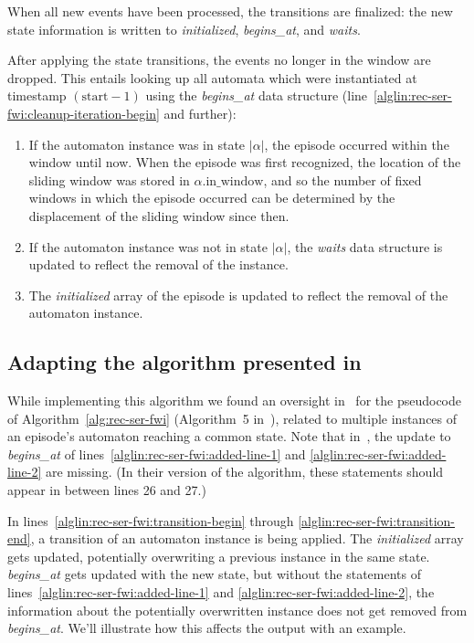 When all new events have been processed, the transitions are finalized: the new state information is written to \emph{initialized}, \emph{begins\_at}, and \emph{waits}.

After applying the state transitions, the events no longer in the window are dropped. This entails looking up all automata which were instantiated at timestamp $ (\text{start} - 1) $ using the \emph{begins\_at} data structure (line~\ref{alglin:rec-ser-fwi:cleanup-iteration-begin} and further):

\begin{enumerate}
\item If the automaton instance was in state $ | \alpha | $, the episode occurred within the window until now. When the episode was first recognized, the location of the sliding window was stored in $ \alpha \text{.in\_window} $, and so the number of fixed windows in which the episode occurred can be determined by the displacement of the sliding window since then.
\item If the automaton instance was not in state $ | \alpha | $, the \emph{waits} data structure is updated to reflect the removal of the instance.
\item The \emph{initialized} array of the episode is updated to reflect the removal of the automaton instance.
\end{enumerate}

\subsection{Adapting the algorithm presented in~\citep{mannila1997discovery}}

While implementing this algorithm we found an oversight in~\citep{mannila1997discovery} for the pseudocode of Algorithm~\ref{alg:rec-ser-fwi} (Algorithm~5 in~\citep{mannila1997discovery}), related to multiple instances of an episode's automaton reaching a common state. Note that in~\citep{mannila1997discovery}, the update to \emph{begins\_at} of lines~\ref{alglin:rec-ser-fwi:added-line-1} and \ref{alglin:rec-ser-fwi:added-line-2} are missing. (In their version of the algorithm, these statements should appear in between lines 26 and 27.)

In lines~\ref{alglin:rec-ser-fwi:transition-begin} through \ref{alglin:rec-ser-fwi:transition-end}, a transition of an automaton instance is being applied. The \emph{initialized} array gets updated, potentially overwriting a previous instance in the same state. \emph{begins\_at} gets updated with the new state, but without the statements of lines~\ref{alglin:rec-ser-fwi:added-line-1} and \ref{alglin:rec-ser-fwi:added-line-2}, the information about the potentially overwritten instance does not get removed from \emph{begins\_at}. We'll illustrate how this affects the output with an example.

